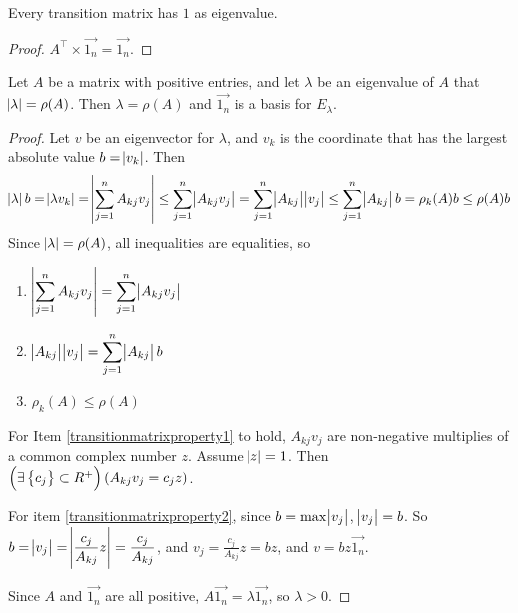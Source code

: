 \begin{theorem}
    Every transition matrix has $1$ as eigenvalue.    
\end{theorem}
\begin{proof}
    $A^\top \times  \vec{1_n} = \vec{1_n}$.
\end{proof}

\begin{theorem}
    Let $A$ be a matrix with positive entries, and let $\lambda$ be an eigenvalue of $A$ that $\abs{\lambda} = \rho(A)$. Then $\lambda = \rho(A)$ and $\vec{1_n}$ is a basis for $E_\lambda$.
\end{theorem}
\begin{proof}
    Let $v$ be an eigenvector for $\lambda$, and $v_k$ is the coordinate that has the largest absolute value $b = \abs{v_k}$. Then
    \begin{equation*}
        \abs{\lambda} b = \abs{\lambda v_k} = \abs{\sum_{j=1}^n A_{kj} v_j} \leq \sum_{j=1}^n \abs{A_{kj} v_j} = \sum_{j=1}^n \abs{A_{kj}} \abs{v_j} \leq \sum_{j=1}^n \abs{A_{kj}} b = \rho_k(A) b \leq \rho(A) b
    \end{equation*}
    Since $\abs{\lambda} = \rho(A)$, all inequalities are equalities, so
    \begin{enumerate}
        \item \label{transitionmatrixproperty1}$\displaystyle \abs{\sum_{j=1}^n A_{kj} v_j} = \sum_{j=1}^n \abs{A_{kj} v_j}$
        \item \label{transitionmatrixproperty2}$\displaystyle \abs{A_{kj}} \abs{v_j} = \sum_{j=1}^n \abs{A_{kj}} b$
        \item \label{transitionmatrixproperty3}$\rho_k(A) \leq \rho(A)$
    \end{enumerate}
    
    For Item \ref{transitionmatrixproperty1} to hold, $A_{kj} v_j$ are non-negative multiplies of a common complex number $z$. Assume $\abs{z}=1$. Then $\left(\exists \set{c_j} \subset R^+ \right) (A_{kj} v_j = c_j z)$.
    
    For item \ref{transitionmatrixproperty2}, since $b = \max \abs{v_j}$, $\abs{v_j} = b$. So $\displaystyle b = \abs{v_j} = \abs{\frac{c_j}{A_{kj}} z} = \frac{c_j}{A_{kj}}$, and $\displaystyle v_j = \frac{c_j}{A_{kj}} z = bz$, and $v = bz \vec{1_n}$.
    
    Since $A$ and $\vec{1_n}$ are all positive, $A \vec{1_n} = \lambda \vec{1_n}$, so $\lambda > 0$.
\end{proof}

